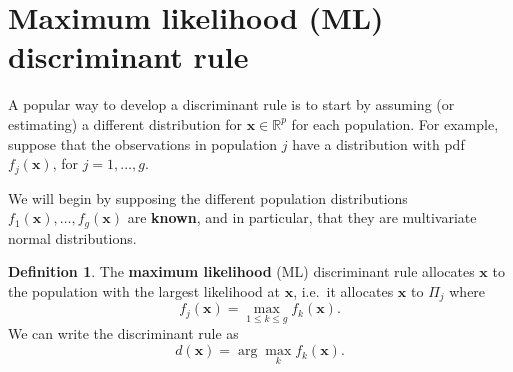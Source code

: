\documentclass[
]{book}
\theoremstyle{definition}
\newtheorem{definition}{Definition}[chapter]
\theoremstyle{definition}
\theoremstyle{definition}
\theoremstyle{definition}
\theoremstyle{remark}
\begin{document}
\section{Maximum likelihood (ML) discriminant rule}\label{lda-ML}

A popular way to develop a discriminant rule is to start by assuming (or estimating) a different distribution for \(\mathbf x\in \mathbb R^p\) for each population. For example, suppose that the observations in population \(j\) have a distribution with pdf \(f_j(\mathbf x)\), for \(j=1,\ldots , g\).

We will begin by supposing the different population distributions \(f_1(\mathbf x), \ldots, f_g(\mathbf x)\) are \textbf{known}, and in particular, that they are multivariate normal distributions.

\begin{definition}
\protect\hypertarget{def:maxlik}{}\label{def:maxlik}The \textbf{maximum likelihood} (ML) discriminant rule
allocates \(\mathbf x\) to the population with the largest likelihood at \(\mathbf x\), i.e.~it allocates \(\mathbf x\) to \(\Pi_j\) where
\[ f_j(\mathbf x)= \max\limits_{1 \leq k \leq g} f_k(\mathbf x). \]
We can write the discriminant rule as
\[d(\mathbf x) = \arg \max_{k} f_k(\mathbf x).\]
\end{definition}
\end{document}
